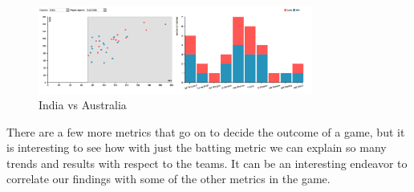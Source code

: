 \documentclass[10pt,journal,compsoc]{IEEEtran}
\begin{document}
\begin{figure}[ht]
\includegraphics[width=9cm]{case5_3.png}
\caption{India vs Australia}
\label{fig:case5_3}
\end{figure}
There are a few more metrics that go on to decide the outcome of a game, but it is interesting to see how with just the batting metric we can explain so many trends and results with respect to the teams. It can be an interesting endeavor to correlate our findings with some of the other metrics in the game.

%
%

\end{document}
